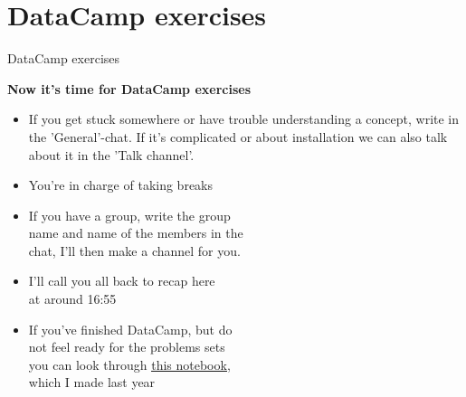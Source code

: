 \documentclass[10pt,danish,t,10pt]{beamer}
\begin{document}
\section{DataCamp exercises}
\begin{frame}{DataCamp exercises}
    
    \textbf{Now it's time for DataCamp exercises}
    \begin{itemize}
        \item If you get stuck somewhere or have trouble understanding a concept, write in the 'General'-chat. If it's complicated or about installation we can also talk about it in the 'Talk channel'.
        \item You're in charge of taking breaks
        \item If you have a group, write the group \\ 
        name and name of the members in the  \\
        chat, I'll then make a channel for you.
        \item I'll call you all back to recap here \\ 
        at around 16:55
        \item If you've finished DataCamp, but do \\
        not feel ready for the problems sets \\ 
        you can look through \href{https://github.com/AskerNC/Teaching_notes/blob/master/3_exercise_class.ipynb}{\underline{this notebook}}, \\ 
        which I made last year
    \end{itemize}
    
    
\end{frame}
\end{document}
